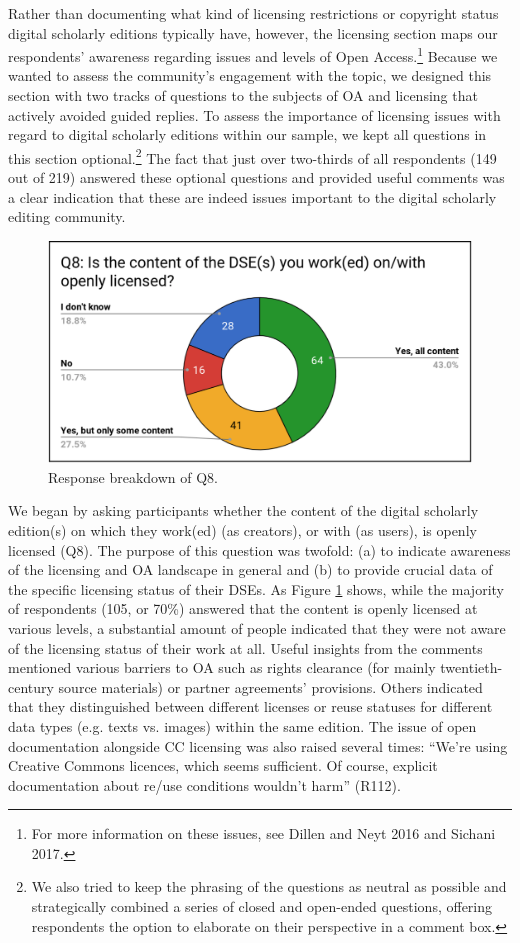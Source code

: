 \begin{paper}
Rather than documenting what kind of licensing restrictions or copyright
status digital scholarly editions typically have, however, the licensing
section maps our respondents' awareness regarding issues and levels of
Open Access.\footnote{For more information on these issues, see Dillen
  and Neyt 2016 and Sichani 2017.} Because we wanted to assess the
community's engagement with the topic, we designed this section with two
tracks of questions to the subjects of OA and licensing that actively
avoided guided replies. To assess the importance of licensing issues
with regard to digital scholarly editions within our sample, we kept all
questions in this section optional.\footnote{We also tried to keep the
  phrasing of the questions as neutral as possible and strategically
  combined a series of closed and open-ended questions, offering
  respondents the option to elaborate on their perspective in a comment
  box.} The fact that just over two-thirds of all respondents (149 out
of 219) answered these optional questions and provided useful comments
was a clear indication that these are indeed issues important to the
digital scholarly editing community.

\begin{figure}[H]
\includegraphics[width=\textwidth]{media/martinez2.png}
\caption{Response breakdown of Q8.}
\label{q8}
\end{figure}

We began by asking participants whether the content of the digital
scholarly edition(s) on which they work(ed) (as creators), or with (as
users), is openly licensed (Q8). The purpose of this question was
twofold: (a) to indicate awareness of the licensing and OA landscape in
general and (b) to provide crucial data of the specific licensing status
of their DSEs. As Figure \ref{q8} shows, while the majority of respondents
(105, or 70\%) answered that the content is openly licensed at various
levels, a substantial amount of people indicated that they were not
aware of the licensing status of their work at all. Useful insights from
the comments mentioned various barriers to OA such as rights clearance
(for mainly twentieth-century source materials) or partner agreements'
provisions. Others indicated that they distinguished between different
licenses or reuse statuses for different data types (e.g. texts vs.
images) within the same edition. The issue of open documentation
alongside CC licensing was also raised several times: ``We're using
Creative Commons licences, which seems sufficient. Of course, explicit
documentation about re/use conditions wouldn't harm'' (R112).


\end{paper}
